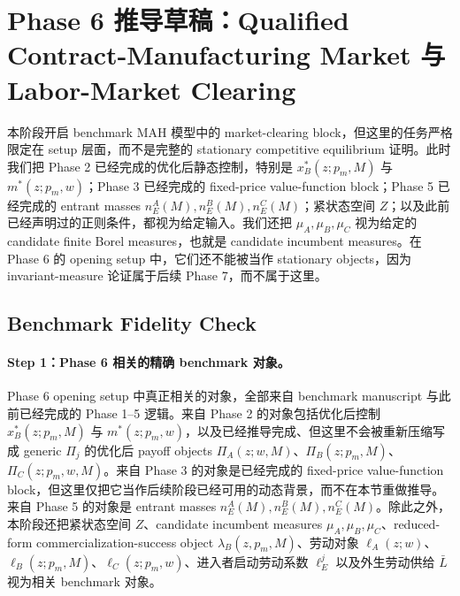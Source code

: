 \section{Phase 6 推导草稿：Qualified Contract-Manufacturing Market 与 Labor-Market Clearing}

本阶段开启 benchmark MAH 模型中的 market-clearing block，但这里的任务严格限定在 setup 层面，而不是完整的 stationary competitive equilibrium 证明。此时我们把 Phase 2 已经完成的优化后静态控制，特别是 $x_B^*(z;p_m,M)$ 与 $m^*(z;p_m,w)$；Phase 3 已经完成的 fixed-price value-function block；Phase 5 已经完成的 entrant masses $n_E^A(M),n_E^B(M),n_E^C(M)$；紧状态空间 $Z$；以及此前已经声明过的正则条件，都视为给定输入。我们还把 $\mu_A,\mu_B,\mu_C$ 视为给定的 candidate finite Borel measures，也就是 candidate incumbent measures。在 Phase 6 的 opening setup 中，它们还不能被当作 stationary objects，因为 invariant-measure 论证属于后续 Phase 7，而不属于这里。

\subsection{Benchmark Fidelity Check}

\paragraph{Step 1：Phase 6 相关的精确 benchmark 对象。}
Phase 6 opening setup 中真正相关的对象，全部来自 benchmark manuscript 与此前已经完成的 Phase 1--5 逻辑。来自 Phase 2 的对象包括优化后控制 $x_B^*(z;p_m,M)$ 与 $m^*(z;p_m,w)$，以及已经推导完成、但这里不会被重新压缩写成 generic $\Pi_j$ 的优化后 payoff objects $\Pi_A(z;w,M)$、$\Pi_B(z;p_m,M)$、$\Pi_C(z;p_m,w,M)$。来自 Phase 3 的对象是已经完成的 fixed-price value-function block，但这里仅把它当作后续阶段已经可用的动态背景，而不在本节重做推导。来自 Phase 5 的对象是 entrant masses $n_E^A(M),n_E^B(M),n_E^C(M)$。除此之外，本阶段还把紧状态空间 $Z$、candidate incumbent measures $\mu_A,\mu_B,\mu_C$、reduced-form commercialization-success object $\lambda_B(z,p_m,M)$、劳动对象 $\ell_A(z;w)$、$\ell_B(z;p_m,M)$、$\ell_C(z;p_m,w)$、进入者启动劳动系数 $\ell_E^j$ 以及外生劳动供给 $\bar L$ 视为相关 benchmark 对象。

